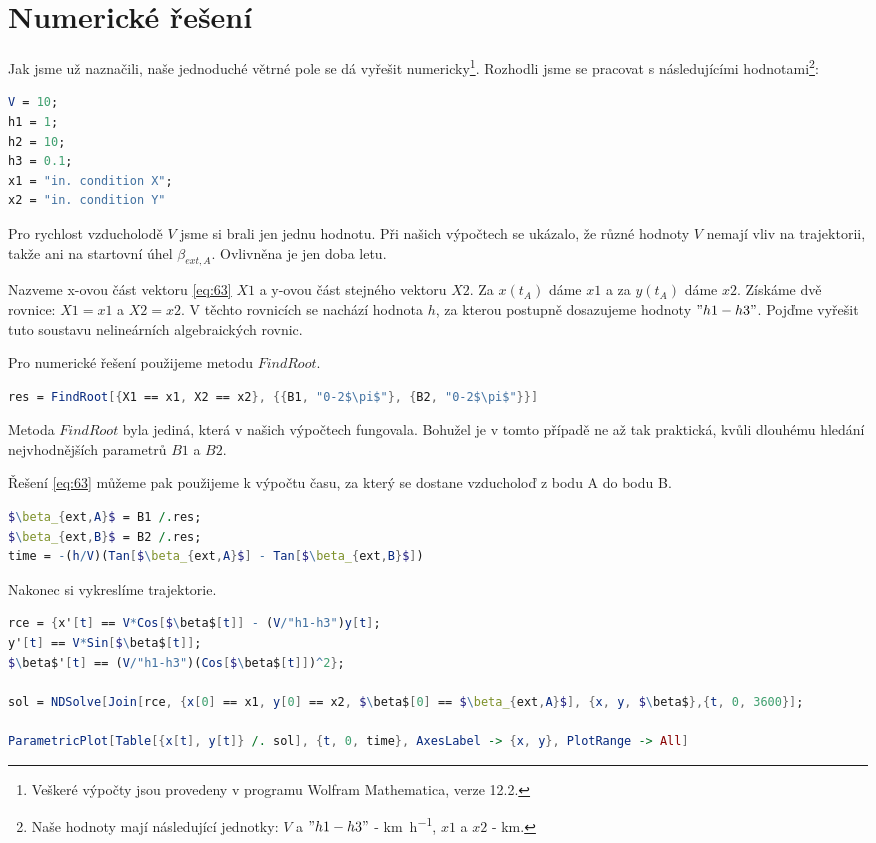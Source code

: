 \documentclass[reqno, a4paper]{amsart}
\numberwithin{equation}{section}
\begin{document}
\section{Numerické řešení}
\label{sec:NumJVP}
Jak jsme už naznačili, naše jednoduché větrné pole se dá vyřešit numericky\footnote{Veškeré výpočty jsou provedeny v programu Wolfram Mathematica, verze 12.2.}. Rozhodli jsme se pracovat s následujícími hodnotami\footnote{Naše hodnoty mají následující jednotky: $V$ a $"h1-h3"$ - \si{km.h^{-1}}, $x1$ a $x2$ - \si{km}.}:
\begin{lstlisting}[language=Mathematica, caption=Hodnoty]
V = 10;
h1 = 1;
h2 = 10;
h3 = 0.1;
x1 = "in. condition X";
x2 = "in. condition Y"
\end{lstlisting}

Pro rychlost vzducholodě $V$ jsme si brali jen jednu hodnotu. Při našich výpočtech se ukázalo, že různé hodnoty $V$ nemají vliv na trajektorii, takže ani na startovní úhel $\beta_{ext,A}$. Ovlivněna je jen doba letu.

Nazveme x-ovou část vektoru \eqref{eq:63} $X1$ a y-ovou část stejného vektoru $X2$. Za $x(t_{A})$ dáme $x1$ a za $y(t_{A})$ dáme $x2$. Získáme dvě rovnice: $X1=x1$ a $X2=x2$. V těchto rovnicích se nachází hodnota $h$, za kterou postupně dosazujeme hodnoty $"h1-h3"$. Pojďme vyřešit tuto soustavu nelineárních algebraických rovnic.

Pro numerické řešení použijeme metodu $FindRoot$. 
 
\begin{lstlisting}[language=Mathematica, caption=Metoda řešení,mathescape]
res = FindRoot[{X1 == x1, X2 == x2}, {{B1, "0-2$\pi$"}, {B2, "0-2$\pi$"}}]
\end{lstlisting}

Metoda $FindRoot$ byla jediná, která v našich výpočtech fungovala. Bohužel je v tomto případě ne až tak praktická, kvůli dlouhému hledání nejvhodnějších parametrů $B1$ a $B2$.

Řešení \eqref{eq:63} můžeme pak použijeme k výpočtu času, za který se dostane vzducholoď z bodu A do bodu B.

\begin{lstlisting}[language=Mathematica, caption=Výpočet času,mathescape]
$\beta_{ext,A}$ = B1 /.res;
$\beta_{ext,B}$ = B2 /.res;
time = -(h/V)(Tan[$\beta_{ext,A}$] - Tan[$\beta_{ext,B}$])
\end{lstlisting}

Nakonec si vykreslíme trajektorie.
\begin{lstlisting}[language=Mathematica, caption=Vykreslení trajektorie,mathescape]
rce = {x'[t] == V*Cos[$\beta$[t]] - (V/"h1-h3")y[t];
y'[t] == V*Sin[$\beta$[t]];
$\beta$'[t] == (V/"h1-h3")(Cos[$\beta$[t]])^2};

sol = NDSolve[Join[rce, {x[0] == x1, y[0] == x2, $\beta$[0] == $\beta_{ext,A}$], {x, y, $\beta$},{t, 0, 3600}];

ParametricPlot[Table[{x[t], y[t]} /. sol], {t, 0, time}, AxesLabel -> {x, y}, PlotRange -> All]
\end{lstlisting}
\end{document}
